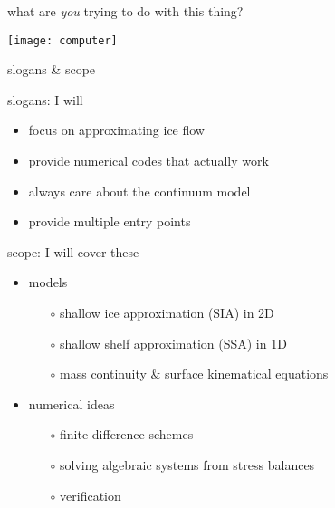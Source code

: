 


\begin{frame}{what are \emph{you} trying to do with this thing?}

\begin{center}
\texttt{[image: computer]}
\end{center}
\end{frame}


\begin{frame}{slogans \& scope}

slogans: I will
  \begin{itemize}
  \item \alert{focus on approximating ice flow}
  \item \alert{provide numerical codes that actually work}
  \item always care about the continuum model
  \item provide multiple entry points
  \end{itemize}
\medskip

scope: I will cover these
  \begin{itemize}
  \item models

    \begin{itemize}
    \item[$\circ$] shallow ice approximation (SIA) in 2D
    \item[$\circ$] shallow shelf approximation (SSA) in 1D
    \item[$\circ$] mass continuity \& surface kinematical equations
    \end{itemize}

  \item numerical ideas

    \begin{itemize}
    \item[$\circ$] finite difference schemes
    \item[$\circ$] solving algebraic systems from stress balances
    \item[$\circ$] verification
    \end{itemize}
  \end{itemize}
\end{frame}


